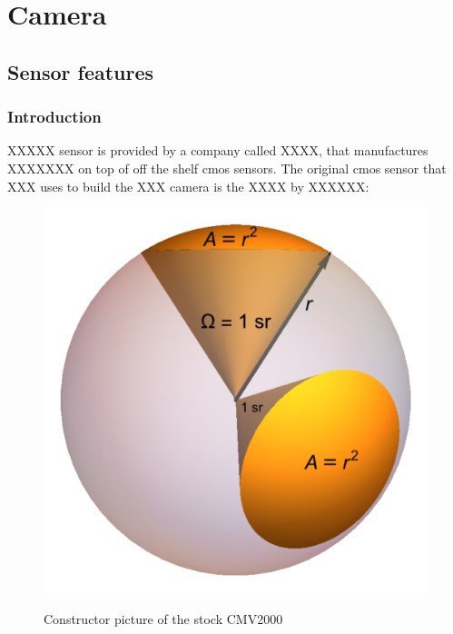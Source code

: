 \documentclass{article}
\begin{document}

\section{Camera}
  \subsection{Sensor features}

    \subsubsection{Introduction}
      XXXXX sensor is provided by a company called XXXX, that manufactures XXXXXXX on top of off the shelf
      cmos sensors. The original cmos sensor that XXX uses to build the XXX camera is the XXXX by XXXXXX:

      \begin{figure}[h!]
	\includegraphics[width=1.0\textwidth]{../../figures/Solid_Angle_1_Steradian.png}\\
	\caption{Constructor picture of the stock CMV2000}
	\label{fig:stock_cmv_picture}
      \end{figure}
\end{document}
